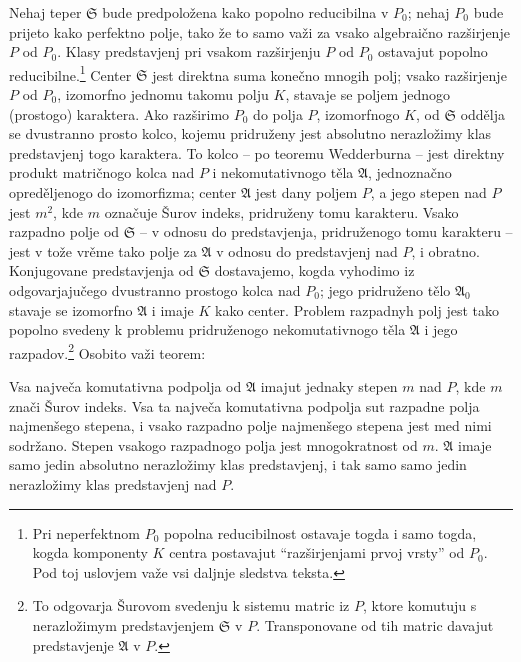\documentclass[11pt]{article}
\newcommand{\mS}{\mathfrak{S}}
\newcommand{\mA}{\mathfrak{A}}
\begin{document}
\noindent Nehaj teper $\mS$ bude predpoložena kako popolno reducibilna v $P_0$; nehaj $P_0$ bude prijeto kako perfektno polje, tako že to samo važi za vsako algebraično razširjenje $P$ od $P_0$. Klasy predstavjenj pri vsakom razširjenju $P$ od $P_0$ ostavajut popolno reducibilne.\footnote{Pri neperfektnom $P_0$ popolna reducibilnost ostavaje togda i samo togda, kogda komponenty $K$ centra postavajut “razširjenjami prvoj vrsty” od $P_0$. Pod toj uslovjem važe vsi daljnje sledstva teksta.} Center $\mS$ jest direktna suma konečno mnogih polj; vsako razširjenje $P$ od $P_0$, izomorfno jednomu takomu polju $K$, stavaje se poljem jednogo (prostogo) karaktera. Ako razširimo $P_0$ do polja $P$, izomorfnogo $K$, od $\mS$ oddělja se dvustranno prosto kolco, kojemu pridruženy jest absolutno nerazložimy klas predstavjenj togo karaktera. To kolco -- po teoremu Wedderburna -- jest direktny produkt matričnogo kolca nad $P$ i nekomutativnogo těla $\mA$, jednoznačno opreděljenogo do izomorfizma; center $\mA$ jest dany poljem $P$, a jego stepen nad $P$ jest $m^2$, kde $m$ označuje Šurov indeks, pridruženy tomu karakteru. Vsako razpadno polje od $\mS$ -- v odnosu do predstavjenja, pridruženogo tomu karakteru -- jest v tože vrěme tako polje za $\mA$ v odnosu do predstavjenj nad $P$, i obratno. Konjugovane predstavjenja od $\mS$ dostavajemo, kogda vyhodimo iz odgovarjajučego dvustranno prostogo kolca nad $P_0$; jego pridruženo tělo $\mA_0$ stavaje se izomorfno $\mA$ i imaje $K$ kako center. Problem razpadnyh polj jest tako popolno svedeny k problemu pridruženogo nekomutativnogo těla $\mA$ i jego razpadov.\footnote{To odgovarja Šurovom svedenju k sistemu matric iz $P$, ktore komutuju s nerazložimym predstavjenjem $\mS$ v $P$. Transponovane od tih matric davajut predstavjenje $\mA$ v $P$.} Osobito važi teorem:

\medskip

\noindent Vsa največa komutativna podpolja od $\mA$ imajut jednaky stepen $m$ nad $P$, kde $m$ znači Šurov indeks. Vsa ta največa komutativna podpolja sut razpadne polja najmenšego stepena, i vsako razpadno polje najmenšego stepena jest med nimi sodržano. Stepen vsakogo razpadnogo polja jest mnogokratnost od $m$. $\mA$ imaje samo jedin absolutno nerazložimy klas predstavjenj, i tak samo samo jedin nerazložimy klas predstavjenj nad $P$.
\end{document}
